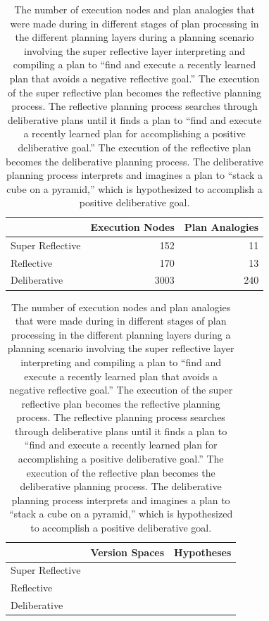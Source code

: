 \begin{table}
\centering
\begin{tabular}{|l|r|r|}
\hline
                 &Execution Nodes &Plan Analogies \\
\hline
Super Reflective & 152            & 11            \\
\hline
Reflective       & 170            & 13            \\
\hline
Deliberative     & 3003           & 240           \\
\hline
\end{tabular}

\begin{tabular}{|l|r|r|}
\hline
                 &Version Spaces &Hypotheses \\
\hline
Super Reflective &               &           \\
\hline
Reflective       &               &           \\
\hline
Deliberative     &               &           \\
\hline
\end{tabular}
\caption{The number of execution nodes and plan analogies that were
  made during in different stages of plan processing in the different
  planning layers during a planning scenario involving the super
  reflective layer interpreting and compiling a plan to ``find and
  execute a recently learned plan that avoids a negative reflective
  goal.''  The execution of the super reflective plan becomes the
  reflective planning process.  The reflective planning process
  searches through deliberative plans until it finds a plan to ``find
  and execute a recently learned plan for accomplishing a positive
  deliberative goal.''  The execution of the reflective plan becomes
  the deliberative planning process.  The deliberative planning
  process interprets and imagines a plan to ``stack a cube on a
  pyramid,'' which is hypothesized to accomplish a positive
  deliberative goal.}
\label{table:plan_interpretation_computational_complexity_of_layers}
\end{table}


